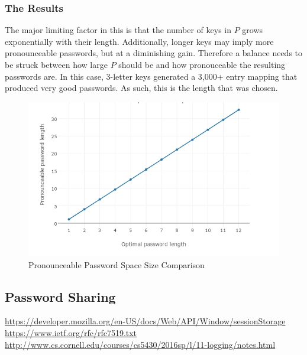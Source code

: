 \documentclass{article}
\begin{document}
\subsubsection{The Results}
\par The major limiting factor in this is that the number of keys in $P$ grows exponentially with their length. Additionally, longer keys may imply more pronounceable passwords, but at a diminishing gain. Therefore a balance needs to be struck between how large $P$ should be and how pronouceable the resulting passwords are. In this case, 3-letter keys generated a 3,000+ entry mapping that produced very good passwords. As such, this is the length that was chosen.
\begin{figure}[H]
  \centering
  \includegraphics[width=0.5\linewidth]{figures/pronounceable.png}
  \caption{Pronounceable Password Space Size Comparison}
  \label{fig:pronounceable_password_space_size_comparison}
\end{figure}

\subsection{Password Sharing}

\begin{thebibliography}{30}
    \url{https://developer.mozilla.org/en-US/docs/Web/API/Window/sessionStorage}
    \url{https://www.ietf.org/rfc/rfc7519.txt}
    \url{http://www.cs.cornell.edu/courses/cs5430/2016sp/l/11-logging/notes.html}
\end{thebibliography}
\end{document}

